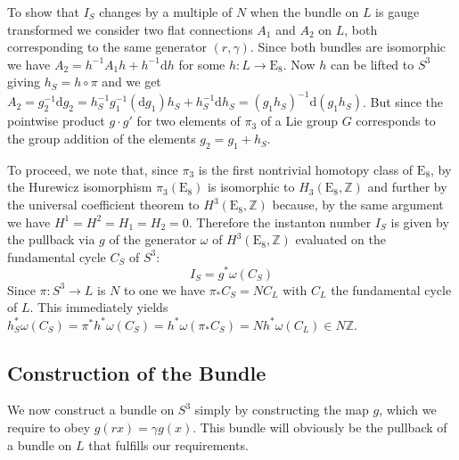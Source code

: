 \documentclass[a4paper,12pt,twoside]{article}
\numberwithin{equation}{section}
\newcommand{\pE}{\text{E}  }     %
\newcommand{\mZ}{\mathbb{Z}}
\newcommand{\Dd}{\text{d}}      %
\newcommand{\auf}{\rightarrow}
\begin{document}
To show that $I_S$ changes by a multiple of $N$ when the bundle on $L$
is gauge transformed we consider two flat connections $A_1$ and $A_2$
on $L$, both corresponding to the same generator $(r,\gamma)$. Since
both bundles are isomorphic we have $A_2 = h^{-1} A_1 h + h^{-1} \Dd
h$ for some $h : L \auf \pE_8$. Now $h$ can be lifted to $S^3$ giving
$h_S = h \circ \pi$ and we get $A_2 = g_2^{-1} \Dd g_2 = h_S^{-1}
g_1^{-1} (\Dd g_1) h_S + h_S^{-1} \Dd h_S = (g_1 h_S)^{-1} \Dd (g_1
h_S)$. But since the pointwise product $g \cdot g'$ for two elements
of $\pi_3$ of a Lie group $G$ corresponds to the group addition of the
elements $g_2 = g_1 + h_S$.

To proceed, we note that, since $\pi_3$ is the first nontrivial
homotopy class of $\pE_8$, by the Hurewicz isomorphism $\pi_3(\pE_8)$
is isomorphic to $H_3(\pE_8, \mZ)$ and further by the universal
coefficient theorem to $H^3(\pE_8, \mZ)$ because, by the same argument
we have $H^1 = H^2 = H_1 = H_2 = 0$. Therefore the instanton number
$I_S$ is given by the pullback via $g$ of the generator $\omega$ of
$H^3(\pE_8, \mZ)$ evaluated on the fundamental cycle $C_S$ of $S^3$:
\begin{equation}
  \label{eq:Ino4}
  I_S = g^* \omega (C_S)
\end{equation}
Since $\pi : S^3 \auf L$ is $N$ to one we have $\pi_* C_S = N C_L$
with $C_L$ the fundamental cycle of $L$. This immediately yields $h_S^*
\omega (C_S) = \pi^* h^* \omega (C_S) = h^* \omega (\pi_* C_S)
= N h^* \omega (C_L) \in N \mZ$.

\subsection{Construction of the Bundle}

We now construct a bundle on $S^3$ simply by constructing the map $g$,
which we require to obey $g(rx) = \gamma g(x)$. This bundle will
obviously be the pullback of a bundle on $L$ that fulfills our
requirements.
\end{document}
